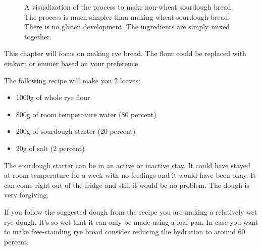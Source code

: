 \begin{figure}[!htb]
  \caption{A visualization of the process to make non-wheat sourdough bread.
  The process is much simpler than making wheat sourdough bread. There is
  no gluten development. The ingredients are simply mixed together.}
  \label{fig:non-wheat-sourdough}
\end{figure}

This chapter will focus on making rye bread. The flour could
be replaced with einkorn or emmer based on your preference.

The following recipe will make you 2 loaves:
\begin{itemize}
  \item 1000g of whole rye flour
  \item 800g of room temperature water (80 percent)
  \item 200g of sourdough starter (20 percent)
  \item 20g of salt (2 percent)
\end{itemize}

The sourdough starter can be in an active or inactive stay. It could have
stayed at room temperature for a week with no feedings and it would
have been okay. It can come right out of the fridge and still it would
be no problem. The dough is very forgiving.

If you follow the suggested dough from the recipe you are making a relatively
wet rye dough. It's so wet that it can only be made using a loaf pan. In case
you want to make free-standing rye bread consider reducing the hydration
to around 60 percent.

